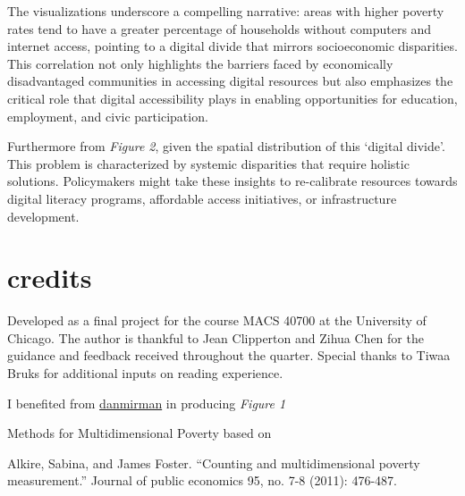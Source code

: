 \documentclass[
  letterpaper,
  DIV=11,
  numbers=noendperiod]{scrreprt}
\begin{document}
The visualizations underscore a compelling narrative: areas with higher
poverty rates tend to have a greater percentage of households without
computers and internet access, pointing to a digital divide that mirrors
socioeconomic disparities. This correlation not only highlights the
barriers faced by economically disadvantaged communities in accessing
digital resources but also emphasizes the critical role that digital
accessibility plays in enabling opportunities for education, employment,
and civic participation.

Furthermore from \emph{Figure 2}, given the spatial distribution of this
`digital divide'. This problem is characterized by systemic disparities
that require holistic solutions. Policymakers might take these insights
to re-calibrate resources towards digital literacy programs, affordable
access initiatives, or infrastructure development.


\chapter{credits}\label{credits}

Developed as a final project for the course MACS 40700 at the University
of Chicago. The author is thankful to Jean Clipperton and Zihua Chen for
the guidance and feedback received throughout the quarter. Special
thanks to Tiwaa Bruks for additional inputs on reading experience.

I benefited from
\href{https://rpubs.com/danmirman/plotting_factor_analysis}{danmirman}
in producing \emph{Figure 1}

Methods for Multidimensional Poverty based on

Alkire, Sabina, and James Foster. ``Counting and multidimensional
poverty measurement.'' Journal of public economics 95, no. 7-8 (2011):
476-487.
\end{document}
